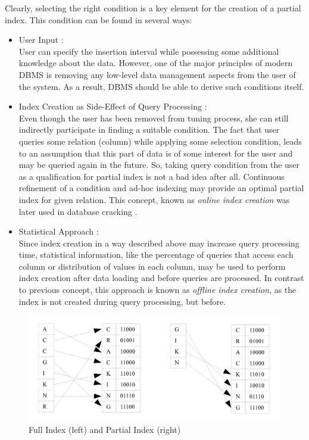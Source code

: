 \documentclass[10pt, conference, compsocconf]{IEEEtran}
\begin{document}
Clearly, selecting the right condition is a key element for the creation of a partial index. This condition can be found in several ways:\\
\begin{itemize}

\item{User Input \cite{partial1}:}\\ User can specify the insertion interval while possessing some additional knowledge about the data. However, one of the major principles of modern DBMS is removing any low-level data management aspects from the user of the system. As a result, DBMS should be able to derive such conditions itself.\\

\item{Index Creation as Side-Effect of Query Processing \cite{partial1}:}\\ Even though the user has been removed from tuning process, she can still indirectly participate in finding a suitable condition. The fact that user queries some relation (column) while applying some selection condition, leads to an assumption that this part of data is of some interest for the user and may be queried again in the future. So, taking query condition from the user as a qualification for partial index is not a bad idea after all. Continuous refinement of a condition and ad-hoc indexing may provide an optimal partial index for given relation. This concept, known as \emph{online index creation} was later used in database cracking \cite{cracking}.\\

\item{Statistical Approach \cite{partial2}:} \\Since index creation in a way described above may increase query processing time, statistical information, like the percentage of queries that access each column or distribution of values in each column, may be used to perform index creation after data loading and before queries are processed. In contrast to previous concept, this approach is known as \emph{offline index creation}, as the index is not created during query processing, but before.
\end{itemize}

\begin{figure}[h]
\centering
\includegraphics[width=\columnwidth]{partial.png}
\caption{Full Index (left) and Partial Index (right)}
\end{figure}
\end{document}
